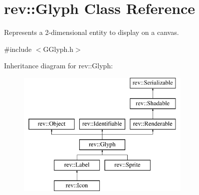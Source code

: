 \hypertarget{classrev_1_1_glyph}{}\section{rev\+::Glyph Class Reference}
\label{classrev_1_1_glyph}


Represents a 2-\/dimensional entity to display on a canvas.  




{\ttfamily \#include $<$G\+Glyph.\+h$>$}

Inheritance diagram for rev\+::Glyph\+:\begin{figure}[H]
\begin{center}
\leavevmode
\includegraphics[height=6.000000cm]{classrev_1_1_glyph}
\end{center}
\end{figure}
